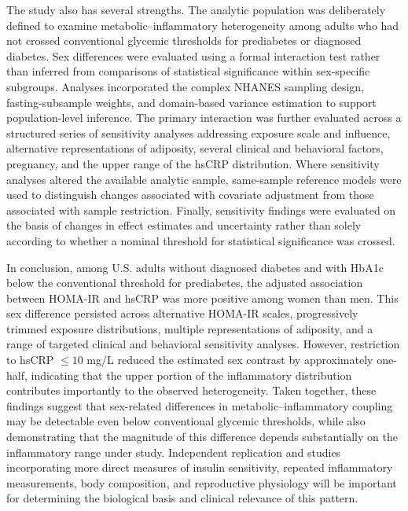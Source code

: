 \documentclass[11pt]{article}
\begin{document}
The study also has several strengths. The analytic population was
deliberately defined to examine metabolic--inflammatory heterogeneity among
adults who had not crossed conventional glycemic thresholds for prediabetes
or diagnosed diabetes. Sex differences were evaluated using a formal
interaction test rather than inferred from comparisons of statistical
significance within sex-specific subgroups. Analyses incorporated the
complex NHANES sampling design, fasting-subsample weights, and domain-based
variance estimation to support population-level inference. The primary
interaction was further evaluated across a structured series of sensitivity
analyses addressing exposure scale and influence, alternative
representations of adiposity, several clinical and behavioral factors,
pregnancy, and the upper range of the hsCRP distribution. Where sensitivity
analyses altered the available analytic sample, same-sample reference models
were used to distinguish changes associated with covariate adjustment from
those associated with sample restriction. Finally, sensitivity findings
were evaluated on the basis of changes in effect estimates and uncertainty
rather than solely according to whether a nominal threshold for statistical
significance was crossed.

In conclusion, among U.S. adults without diagnosed diabetes and with HbA1c
below the conventional threshold for prediabetes, the adjusted association
between HOMA-IR and hsCRP was more positive among women than men. This sex
difference persisted across alternative HOMA-IR scales, progressively
trimmed exposure distributions, multiple representations of adiposity, and
a range of targeted clinical and behavioral sensitivity analyses. However,
restriction to hsCRP $\leq10$ mg/L reduced the estimated sex contrast by
approximately one-half, indicating that the upper portion of the
inflammatory distribution contributes importantly to the observed
heterogeneity. Taken together, these findings suggest that sex-related
differences in metabolic--inflammatory coupling may be detectable even
below conventional glycemic thresholds, while also demonstrating that the
magnitude of this difference depends substantially on the inflammatory
range under study. Independent replication and studies incorporating more
direct measures of insulin sensitivity, repeated inflammatory measurements,
body composition, and reproductive physiology will be important for
determining the biological basis and clinical relevance of this pattern.

\end{document}
